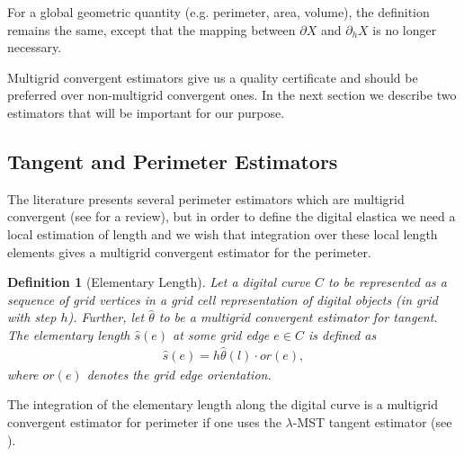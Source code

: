 \documentclass[runningheads]{llncs}
\newtheorem{ddef}{Definition}
\begin{document}
For a global geometric quantity (e.g. perimeter, area, volume), the definition remains the same, except that the mapping between $\partial X$ and $\partial_h X$ is no longer necessary.
	
	
Multigrid convergent estimators give us a quality certificate and should be preferred over non-multigrid convergent ones. In the next section we describe two estimators that will be important for our purpose.
	


\subsection{Tangent and Perimeter Estimators}

The literature presents several perimeter estimators which are multigrid convergent (see \cite{coeurjolly04,coeurjolly12} for a review), but in order to define the digital elastica we need a local estimation of length and we wish that integration over these local length elements gives a multigrid convergent estimator for the perimeter. 

\begin{ddef}[Elementary Length]
  Let a digital curve $C$ to be represented as a sequence of grid vertices in a grid cell representation of digital objects (in grid with step $h$). Further, let $\hat{\theta}$ to be a multigrid convergent estimator for tangent. The elementary length $\hat{s}(e)$ at some grid edge $e\in C$ is defined as
  \begin{align*}
    \hat{s}(e) = h \hat{\theta}(l) \cdot or(e),
  \end{align*}
  where $or(e)$ denotes the grid edge orientation.
\end{ddef}
The integration of the elementary length along the digital curve is a multigrid convergent estimator for perimeter if one uses the $\lambda$-MST \cite{lachaud07} tangent estimator (see \cite{lachaud06}).
\end{document}
